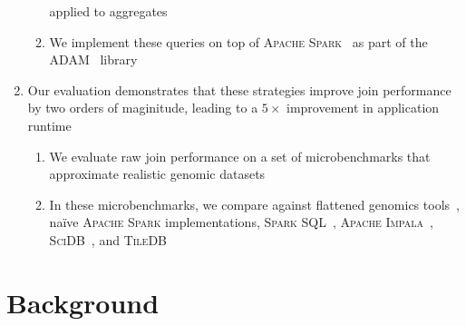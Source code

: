 \documentclass{vldb}
\begin{document}
\begin{enumerate}
\begin{enumerate}
applied to aggregates
\item We implement these queries on top of \textsc{Apache Spark}~\cite{zaharia12,
zaharia10} as part of the \textsc{ADAM}~\cite{massie13, nothaft15} library
\end{enumerate}
\item Our evaluation demonstrates that these strategies improve join performance
by two orders of maginitude, leading to a $5\times$ improvement in application
runtime
\begin{enumerate}
\item We evaluate raw join performance on a set of microbenchmarks that approximate
realistic genomic datasets
\item In these microbenchmarks, we compare against flattened genomics
tools~\cite{quinlan10}, na\"{i}ve \textsc{Apache Spark} implementations,
\textsc{Spark SQL}~\cite{armbrust15}, \textsc{Apache Impala}~\cite{kornacker15},
\textsc{SciDB}~\cite{brown10, taft14}, and \textsc{TileDB}~\cite{papadopoulos16}
\end{enumerate}
\end{enumerate}

\section{Background}
\label{sec:background}
\end{document}
